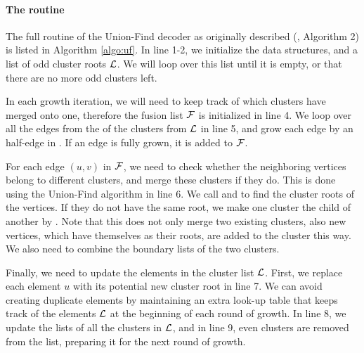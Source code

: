 \paragraph{The routine}
The full routine of the Union-Find decoder as originally described (\cite{delfosse2017almost}, Algorithm 2) is listed in Algorithm \ref{algo:uf}. In line 1-2, we initialize the data structures, and a list of odd cluster roots $\mathcal{L}$. We will loop over this list until it is empty, or that there are no more odd clusters left.

In each growth iteration, we will need to keep track of which clusters have merged onto one, therefore the fusion list $\mathcal{F}$ is initialized in line 4. We loop over all the edges from the  of the clusters from $\mathcal{L}$ in line 5, and grow each edge by an half-edge in . If an edge is fully grown, it is added to $\mathcal{F}$.

For each edge $(u,v)$ in $\mathcal{F}$, we need to check whether the neighboring vertices belong to different clusters, and merge these clusters if they do. This is done using the Union-Find algorithm in line 6. We call  and  to find the cluster roots of the vertices. If they do not have the same root, we make one cluster the child of another by . Note that this does not only merge two existing clusters, also new vertices, which have themselves as their roots, are added to the cluster this way. We also need to combine the boundary lists of the two clusters.

Finally, we need to update the elements in the cluster list $\mathcal{L}$. First, we replace each element $u$ with its potential new cluster root  in line 7. We can avoid creating duplicate elements by maintaining an extra look-up table that keeps track of the elements $\mathcal{L}$ at the beginning of each round of growth. In line 8, we update the  lists of all the clusters in $\mathcal{L}$, and in line 9, even clusters are removed from the list, preparing it for the next round of growth.

